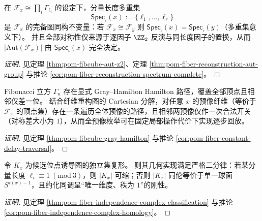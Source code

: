 \begin{conclusion}\label{con:xi-terminal-fiber-geometry-complete-spectrum}
在 \(\mathcal F_x\cong\prod_i \Gamma_{\ell_i}\) 的设定下，分量长度多重集
\[
\mathsf{Spec}_{\square}(x):=\{\ell_1,\dots,\ell_r\}
\]
是 \(\mathcal F_x\) 的完备图同构不变量：若 \(\mathcal F_x\cong \mathcal F_y\) 则 \(\mathsf{Spec}_{\square}(x)=\mathsf{Spec}_{\square}(y)\)（多重集意义下）。
并且全部对称性仅来源于逐因子 \(\ZZ_2\) 反演与同长度因子的置换，从而 \(|\mathrm{Aut}(\mathcal F_x)|\) 由 \(\mathsf{Spec}_{\square}(x)\) 完全决定。
\end{conclusion}
\begin{proof}[证明]
见定理 \ref{thm:pom-fibcube-aut-z2}、定理 \ref{thm:pom-fiber-reconstruction-aut-group} 与推论 \ref{cor:pom-fiber-reconstruction-spectrum-complete}。
\end{proof}

\begin{conclusion}\label{con:xi-terminal-gray-hamilton-fiberization}
Fibonacci 立方 \(\Gamma_n\) 存在显式 Gray--Hamilton Hamilton 路径，覆盖全部顶点且相邻仅差一位。
结合纤维重构图的 Cartesian 分解，对任意 \(x\) 的预像纤维（等价于 \(\mathcal F_x\) 的顶点集）存在一条遍历全体预像的路径，且相邻两预像仅作一次合法开关（对称差大小为 \(1\)），从而全预像枚举可在固定局部操作代价下实现逐步回放。
\end{conclusion}
\begin{proof}[证明]
见定理 \ref{thm:pom-fibcube-gray-hamilton} 与推论 \ref{cor:pom-fiber-constant-delay-traversal}。
\end{proof}

\begin{conclusion}\label{con:xi-terminal-fiber-indcomplex-homotopy-dichotomy}
令 \(K_x\) 为候选位点诱导图的独立集复形。
则其几何实现满足严格二分律：若某分量长度 \(\ell_i\equiv 1\ (\mathrm{mod}\ 3)\)，则 \(|K_x|\) 可缩；否则 \(|K_x|\) 同伦等价于单一球面 \(S^{\tau(x)-1}\)，且约化同调呈“唯一维度、秩为 \(1\)”的刚性。
\end{conclusion}
\begin{proof}[证明]
见定理 \ref{thm:pom-fiber-independence-complex-classification} 与推论 \ref{cor:pom-fiber-independence-complex-homology}。
\end{proof}

